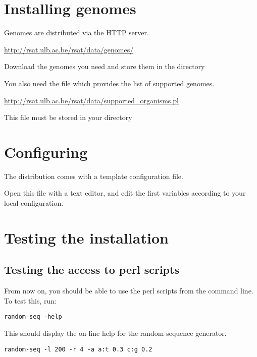 \documentclass{article}
\begin{document}
\section{Installing genomes}

Genomes are distributed via the HTTP server. 

\url{http://rsat.ulb.ac.be/rsat/data/genomes/}

Download the genomes you need and store them in the directory


You also need the file which provides the list of supported genomes.

\url{http://rsat.ulb.ac.be/rsat/data/supported\_organisms.pl}

This file must be stored in your directory



\section{Configuring \RSAT}

The \RSAT distribution comes with a template configuration file.


Open this file with a text editor, and edit the first variables
according to your local configuration.

\section{Testing the installation}

\subsection{Testing the access to perl scripts}

From now on, you should be able to use the perl scripts from the
command line. To test this, run: 

\begin{verbatim}
random-seq -help
\end{verbatim}

This should display the on-line help for the random sequence
generator. 

\begin{verbatim}
random-seq -l 200 -r 4 -a a:t 0.3 c:g 0.2
\end{verbatim}
\end{document}
